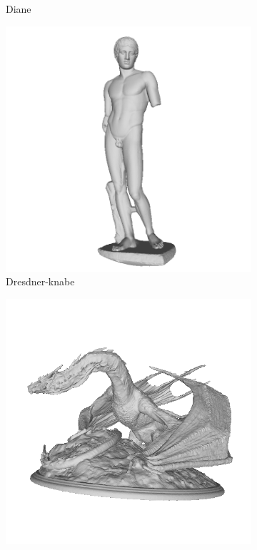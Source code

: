 \begin{figure}
\begin{subfigure}[b]{0.23\linewidth}
		\caption{Diane}
	\end{subfigure}
	\begin{subfigure}[b]{0.23\linewidth}
	\includegraphics[width=\linewidth]{./Figures/train-dataset/16.dresdner-knabe.png}
	\caption{Dresdner-knabe}
\end{subfigure}
\begin{subfigure}[b]{0.23\linewidth}
	\includegraphics[width=\linewidth]{./Figures/train-dataset/17.fantasy-dragon.png}

\end{subfigure}
\end{figure}

